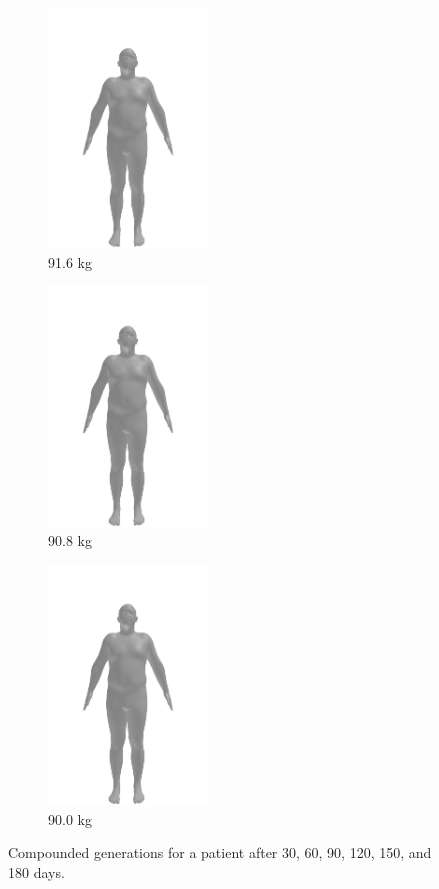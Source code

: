 \begin{figure}[h]
	\begin{subfigure}{0.3\textwidth}
		\centering
		\includegraphics[width=120pt]{files/patients/2_predicted_5.png}
		\caption{91.6 kg}
	\end{subfigure}
	\begin{subfigure}{0.3\textwidth}
		\centering
		\includegraphics[width=120pt]{files/patients/2_predicted_6.png}
		\caption{90.8 kg}
	\end{subfigure}
	\begin{subfigure}{0.3\textwidth}
		\centering
		\includegraphics[width=120pt]{files/patients/2_predicted_7.png}
		\caption{90.0 kg}
	\end{subfigure}
	\caption[Compounded generations]{Compounded generations for a patient after 30, 60, 90, 120, 150, and 180 days.}
	\label{fig:pred-2}
\end{figure}

